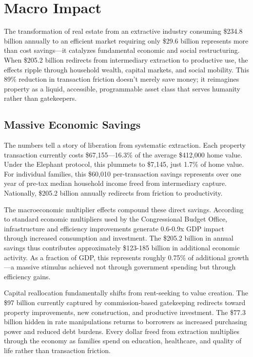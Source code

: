 \chapter{Macro Impact}

The transformation of real estate from an extractive industry consuming \$234.8 billion annually to an efficient market requiring only \$29.6 billion represents more than cost savings—it catalyzes fundamental economic and social restructuring. When \$205.2 billion redirects from intermediary extraction to productive use, the effects ripple through household wealth, capital markets, and social mobility. This 89\% reduction in transaction friction doesn't merely save money; it reimagines property as a liquid, accessible, programmable asset class that serves humanity rather than gatekeepers.

\section{Massive Economic Savings}

The numbers tell a story of liberation from systematic extraction. Each property transaction currently costs \$67,155—16.3\% of the average \$412,000 home value. Under the Elephant protocol, this plummets to \$7,145, just 1.7\% of home value. For individual families, this \$60,010 per-transaction savings represents over one year of pre-tax median household income freed from intermediary capture. Nationally, \$205.2 billion annually redirects from friction to productivity.

The macroeconomic multiplier effects compound these direct savings. According to standard economic multipliers used by the Congressional Budget Office, infrastructure and efficiency improvements generate 0.6-0.9x GDP impact through increased consumption and investment. The \$205.2 billion in annual savings thus contributes approximately \$123-185 billion in additional economic activity. As a fraction of GDP, this represents roughly 0.75\% of additional growth—a massive stimulus achieved not through government spending but through efficiency gains.

Capital reallocation fundamentally shifts from rent-seeking to value creation. The \$97 billion currently captured by commission-based gatekeeping redirects toward property improvements, new construction, and productive investment. The \$77.3 billion hidden in rate manipulations returns to borrowers as increased purchasing power and reduced debt burdens. Every dollar freed from extraction multiplies through the economy as families spend on education, healthcare, and quality of life rather than transaction friction.

